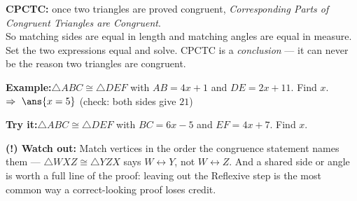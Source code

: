 \documentclass[12pt]{article}
\begin{document}
\begin{formulabox}\textbf{CPCTC:} once two triangles are proved congruent, \emph{Corresponding
Parts of Congruent Triangles are Congruent}.\\[3pt]
So matching sides are equal in length and matching angles are equal in measure. Set the two
expressions equal and solve. CPCTC is a \emph{conclusion} --- it can never be the reason two
triangles are congruent.
\end{formulabox}
\begin{examplebox}\textbf{Example:}\quad $\triangle ABC \cong \triangle DEF$ with $AB = 4x + 1$
and $DE = 2x + 11$. Find $x$.
$\Rightarrow\ \ans{x = 5}$ \quad (check: both sides give $21$)
\end{examplebox}
\begin{tryitbox}\textbf{Try it:}\quad $\triangle ABC \cong \triangle DEF$ with $BC = 6x - 5$
and $EF = 4x + 7$. Find $x$.\\[2pt]
\end{tryitbox}

\begin{watchoutbox}\textbf{(!) Watch out:} Match vertices in the order the congruence statement
names them --- $\triangle WXZ \cong \triangle YZX$ says $W \leftrightarrow Y$, not
$W \leftrightarrow Z$. And a shared side or angle is worth a full line of the proof: leaving out
the Reflexive step is the most common way a correct-looking proof loses credit.
\end{watchoutbox}
\end{document}
